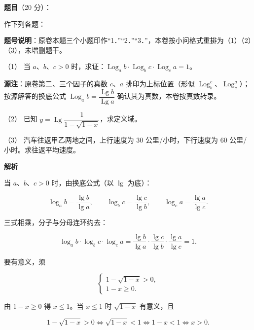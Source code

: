 \begin{answer}

\textbf{题目}（20 分）：

作下列各题：

\begin{gktip}
\textbf{题号说明}：原卷本题三个小题印作“1．”“2．”“3．”，本卷按小问格式重排为（1）（2）（3），未增删题干。
\end{gktip}

（1） 当 $a\text{、}b\text{、}c>0$ 时，求证：$\operatorname{Log}_a b\cdot\operatorname{Log}_b c\cdot\operatorname{Log}_c a=1$。

\begin{gktip}
\textbf{源注}：原卷第二、三个因子的真数 $c\text{、}a$ 排印为上标位置（形似 $\operatorname{Log}_b^c$、$\operatorname{Log}_c^a$）；按源解答的换底公式 $\operatorname{Log}_a b=\dfrac{\operatorname{Lg}b}{\operatorname{Lg}a}$ 确认其为真数，本卷按真数转录。
\end{gktip}

（2） 已知 $y=\operatorname{Lg}\dfrac{1}{1-\sqrt{1-x}}$，求定义域。

（3） 汽车往返甲乙两地之间，上行速度为 30 公里/小时，下行速度为 60 公里/小时。求往返平均速度。

\textbf{解析}


当 $a\text{、}b\text{、}c>0$ 时，由换底公式（以 $\lg$ 为底）：

\nopagebreak[4]
\[
\log_a b=\frac{\lg b}{\lg a},\qquad
\log_b c=\frac{\lg c}{\lg b},\qquad
\log_c a=\frac{\lg a}{\lg c}.
\]

三式相乘，分子与分母连环约去：

\nopagebreak[4]
\[
\log_a b\cdot\log_b c\cdot\log_c a
=\frac{\lg b}{\lg a}\cdot\frac{\lg c}{\lg b}\cdot\frac{\lg a}{\lg c}=1.
\]


要有意义，须

\nopagebreak[4]
\[
\begin{cases}
1-\sqrt{1-x}>0,\\
1-x\ge0.
\end{cases}
\]

由 $1-x\ge0$ 得 $x\le1$。当 $x\le1$ 时 $\sqrt{1-x}$ 有意义，且

\nopagebreak[4]
\[
1-\sqrt{1-x}>0
\iff\sqrt{1-x}<1
\iff1-x<1
\iff x>0.
\]


\end{answer}
